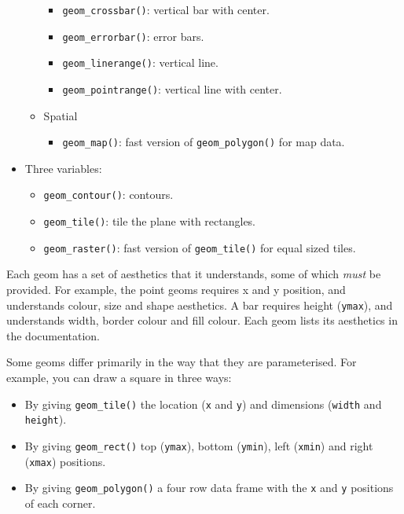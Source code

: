\begin{itemize}
\begin{itemize}
    \begin{itemize}
    \tightlist
    \item
      \texttt{geom\_crossbar()}: vertical bar with center.
    \item
      \texttt{geom\_errorbar()}: error bars.
    \item
      \texttt{geom\_linerange()}: vertical line.
    \item
      \texttt{geom\_pointrange()}: vertical line with center.
    \end{itemize}
  \item
    Spatial

    \begin{itemize}
    \tightlist
    \item
      \texttt{geom\_map()}: fast version of \texttt{geom\_polygon()} for
      map data.
    \end{itemize}
  \end{itemize}
\item
  Three variables:

  \begin{itemize}
  \tightlist
  \item
    \texttt{geom\_contour()}: contours.
  \item
    \texttt{geom\_tile()}: tile the plane with rectangles.
  \item
    \texttt{geom\_raster()}: fast version of \texttt{geom\_tile()} for
    equal sized tiles.
  \end{itemize}
\end{itemize}

Each geom has a set of aesthetics that it understands, some of which
\emph{must} be provided. For example, the point geoms requires x and y
position, and understands colour, size and shape aesthetics. A bar
requires height (\texttt{ymax}), and understands width, border colour
and fill colour. Each geom lists its aesthetics in the documentation.

Some geoms differ primarily in the way that they are parameterised. For
example, you can draw a square in three ways:

\begin{itemize}
\item
  By giving \texttt{geom\_tile()} the location (\texttt{x} and
  \texttt{y}) and dimensions (\texttt{width} and \texttt{height}).
\item
  By giving \texttt{geom\_rect()} top (\texttt{ymax}), bottom
  (\texttt{ymin}), left (\texttt{xmin}) and right (\texttt{xmax})
  positions. 
\item
  By giving \texttt{geom\_polygon()} a four row data frame with the
  \texttt{x} and \texttt{y} positions of each corner.
\end{itemize}

